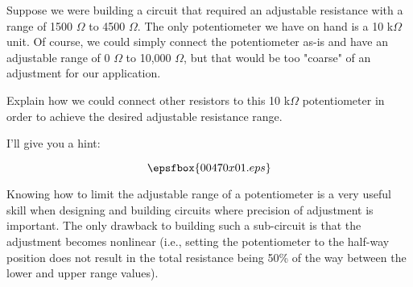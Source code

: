 

Suppose we were building a circuit that required an adjustable resistance with a range of 1500 $\Omega$ to 4500 $\Omega$.  The only potentiometer we have on hand is a 10 k$\Omega$ unit.  Of course, we could simply connect the potentiometer as-is and have an adjustable range of 0 $\Omega$ to 10,000 $\Omega$, but that would be too "coarse" of an adjustment for our application.

Explain how we could connect other resistors to this 10 k$\Omega$ potentiometer in order to achieve the desired adjustable resistance range.







I'll give you a hint:

$$\epsfbox{00470x01.eps}$$







Knowing how to limit the adjustable range of a potentiometer is a very useful skill when designing and building circuits where precision of adjustment is important.  The only drawback to building such a sub-circuit is that the adjustment becomes nonlinear (i.e., setting the potentiometer to the half-way position does not result in the total resistance being 50\% of the way between the lower and upper range values).




